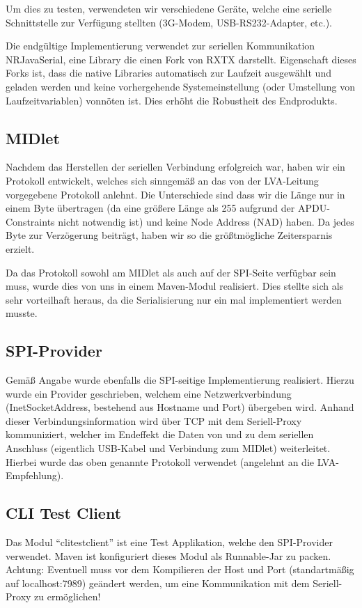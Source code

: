 \documentclass[paper=a4, fontsize=11pt]{scrartcl}
\begin{document}
Um dies zu testen, verwendeten wir verschiedene Geräte, welche eine serielle Schnittstelle zur Verfügung stellten (3G-Modem, USB-RS232-Adapter, etc.).

Die endgültige Implementierung verwendet zur seriellen Kommunikation NRJavaSerial, eine Library die einen Fork von RXTX darstellt. Eigenschaft dieses Forks ist, dass die native Libraries automatisch zur Laufzeit ausgewählt und geladen werden und keine vorhergehende Systemeinstellung (oder Umstellung von Laufzeitvariablen) vonnöten ist. Dies erhöht die Robustheit des Endprodukts.

\subsection{MIDlet}
Nachdem das Herstellen der seriellen Verbindung erfolgreich war, haben wir ein Protokoll entwickelt, welches sich sinngemäß an das von der LVA-Leitung vorgegebene Protokoll anlehnt. Die Unterschiede sind dass wir die Länge nur in einem Byte übertragen (da eine größere Länge als 255 aufgrund der APDU-Constraints nicht notwendig ist) und keine Node Address (NAD) haben. Da jedes Byte zur Verzögerung beiträgt, haben wir so die größtmögliche Zeitersparnis erzielt.

Da das Protokoll sowohl am MIDlet als auch auf der SPI-Seite verfügbar sein muss, wurde dies von uns in einem Maven-Modul realisiert. Dies stellte sich als sehr vorteilhaft heraus, da die Serialisierung nur ein mal implementiert werden musste.

\subsection{SPI-Provider}
Gemäß Angabe wurde ebenfalls die SPI-seitige Implementierung realisiert. Hierzu wurde ein Provider geschrieben, welchem eine Netzwerkverbindung (InetSocketAddress, bestehend aus Hostname und Port) übergeben wird. Anhand dieser Verbindungsinformation wird über TCP mit dem Seriell-Proxy kommuniziert, welcher im Endeffekt die Daten von und zu dem seriellen Anschluss (eigentlich USB-Kabel und Verbindung zum MIDlet) weiterleitet. Hierbei wurde das oben genannte Protokoll verwendet (angelehnt an die LVA-Empfehlung).

\subsection{CLI Test Client}
Das Modul \enquote{clitestclient} ist eine Test Applikation, welche den SPI-Provider verwendet. Maven ist konfiguriert dieses Modul als Runnable-Jar zu packen. Achtung: Eventuell muss vor dem Kompilieren der Host und Port (standartmäßig auf localhost:7989) geändert werden, um eine Kommunikation mit dem Seriell-Proxy zu ermöglichen!
\end{document}
